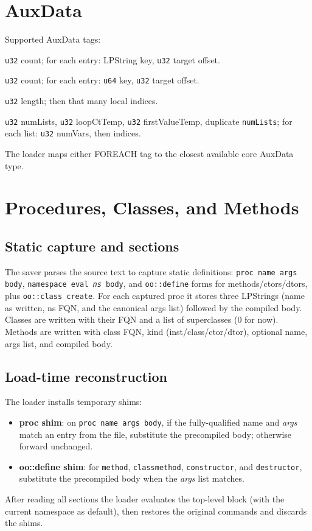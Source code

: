 \documentclass[11pt,a4paper]{article}
\begin{document}
\section{AuxData}
\label{sec:aux}
Supported AuxData tags:
\begin{description}[style=nextline]
  \item[JT\_STR (0)] \texttt{u32} count; for each entry: LPString key, \texttt{u32} target offset.
  \item[JT\_NUM (1)] \texttt{u32} count; for each entry: \texttt{u64} key, \texttt{u32} target offset.
  \item[DICT\_UPDATE (2)] \texttt{u32} length; then that many local indices.
  \item[NEW\_FOREACH (3), FOREACH (4)] \texttt{u32} numLists, \texttt{u32} loopCtTemp, \texttt{u32} firstValueTemp, duplicate \texttt{numLists}; for each list: \texttt{u32} numVars, then indices.
\end{description}
The loader maps either FOREACH tag to the closest available core AuxData type.

\section{Procedures, Classes, and Methods}
\subsection{Static capture and sections}
The saver parses the source text to capture static definitions:
\texttt{proc name args body}, \texttt{namespace eval \emph{ns} body},
and \texttt{oo::define} forms for methods/ctors/dtors, plus \texttt{oo::class create}.
For each captured proc it stores three LPStrings (name as written, ns FQN, and the canonical args list)
followed by the compiled body. Classes are written with their FQN and a list of superclasses (0 for now).
Methods are written with class FQN, kind (inst/class/ctor/dtor), optional name, args list, and compiled body.

\subsection{Load-time reconstruction}
The loader installs temporary shims:
\begin{itemize}[nosep]
  \item \textbf{proc shim}: on \texttt{proc name args body}, if the fully-qualified name and \emph{args}
        match an entry from the file, substitute the precompiled body; otherwise forward unchanged.
  \item \textbf{oo::define shim}: for \texttt{method}, \texttt{classmethod}, \texttt{constructor},
        and \texttt{destructor}, substitute the precompiled body when the \emph{args} list matches.
\end{itemize}
After reading all sections the loader evaluates the top-level block (with the current namespace as default),
then restores the original commands and discards the shims.
\end{document}
